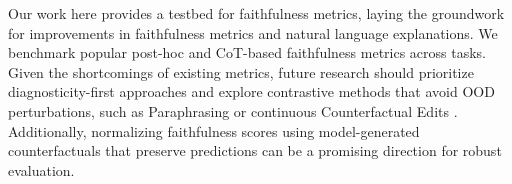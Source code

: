 
Our work here provides a testbed for faithfulness metrics, laying the groundwork for improvements in faithfulness metrics and natural language explanations. We benchmark popular post-hoc and CoT-based faithfulness metrics across tasks.  Given the shortcomings of existing metrics, future research should prioritize diagnosticity-first approaches and explore contrastive methods that avoid OOD perturbations, such as Paraphrasing or continuous Counterfactual Edits \citep{siegel-etal-2024-probabilities}. Additionally, normalizing faithfulness scores using model-generated counterfactuals that preserve predictions can be a promising direction for robust evaluation.